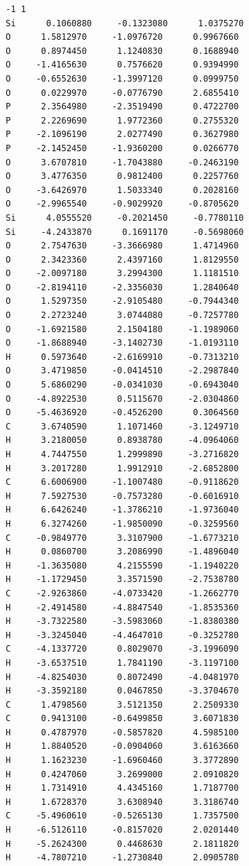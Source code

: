 \documentclass[
digital, %
table,   %
lof,     %
lot,     %
oneside,
]{fithesis3}
\begin{document}
\begin{lstlisting}[frame=single, caption={struktura koordinace 5},label=DescriptiveLabel]
-1 1
Si      0.1060880     -0.1323080      1.0375270
O      1.5812970     -1.0976720      0.9967660
O      0.8974450      1.1240830      0.1688940
O     -1.4165630      0.7576620      0.9394990
O     -0.6552630     -1.3997120      0.0999750
O      0.0229970     -0.0776790      2.6855410
P      2.3564980     -2.3519490      0.4722700
P      2.2269690      1.9772360      0.2755320
P     -2.1096190      2.0277490      0.3627980
P     -2.1452450     -1.9360200      0.0266770
O      3.6707810     -1.7043880     -0.2463190
O      3.4776350      0.9812400      0.2257760
O     -3.6426970      1.5033340      0.2028160
O     -2.9965540     -0.9029920     -0.8705620
Si      4.0555520     -0.2021450     -0.7780110
Si     -4.2433870      0.1691170     -0.5698060
O      2.7547630     -3.3666980      1.4714960
O      2.3423360      2.4397160      1.8129550
O     -2.0097180      3.2994300      1.1181510
O     -2.8194110     -2.3356030      1.2840640
O      1.5297350     -2.9105480     -0.7944340
O      2.2723240      3.0744080     -0.7257780
O     -1.6921580      2.1504180     -1.1989060
O     -1.8688940     -3.1402730     -1.0193110
H      0.5973640     -2.6169910     -0.7313210
O      3.4719850     -0.0414510     -2.2987840
O      5.6860290     -0.0341030     -0.6943040
O     -4.8922530      0.5115670     -2.0304860
O     -5.4636920     -0.4526200      0.3064560
C      3.6740590      1.1071460     -3.1249710
H      3.2180050      0.8938780     -4.0964060
H      4.7447550      1.2999890     -3.2716820
H      3.2017280      1.9912910     -2.6852800
C      6.6006900     -1.1007480     -0.9118620
H      7.5927530     -0.7573280     -0.6016910
H      6.6426240     -1.3786210     -1.9736040
H      6.3274260     -1.9850090     -0.3259560
C     -0.9849770      3.3107900     -1.6773210
H      0.0860700      3.2086990     -1.4896040
H     -1.3635080      4.2155590     -1.1940220
H     -1.1729450      3.3571590     -2.7538780
C     -2.9263860     -4.0733420     -1.2662770
H     -2.4914580     -4.8847540     -1.8535360
H     -3.7322580     -3.5983060     -1.8380380
H     -3.3245040     -4.4647010     -0.3252780
C     -4.1337720      0.8029070     -3.1996090
H     -3.6537510      1.7841190     -3.1197100
H     -4.8254030      0.8072490     -4.0481970
H     -3.3592180      0.0467850     -3.3704670
C      1.4798560      3.5121350      2.2509330
C      0.9413100     -0.6499850      3.6071830
H      0.4787970     -0.5857820      4.5985100
H      1.8840520     -0.0904060      3.6163660
H      1.1623230     -1.6960460      3.3772890
H      0.4247060      3.2699000      2.0910820
H      1.7314910      4.4345160      1.7187700
H      1.6728370      3.6308940      3.3186740
C     -5.4960610     -0.5265130      1.7357500
H     -6.5126110     -0.8157020      2.0201440
H     -5.2624300      0.4468630      2.1811820
H     -4.7807210     -1.2730840      2.0905780

\end{lstlisting}
\end{document}
